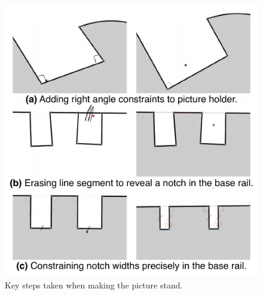 \begin{figure}
  \centering
  \includegraphics{img/motivating-example.pdf}
  \caption[Interaction Steps to Make A Picture Frame]{Key steps taken when
    making the picture stand.}
  \label{fig:motivating}
\end{figure}
